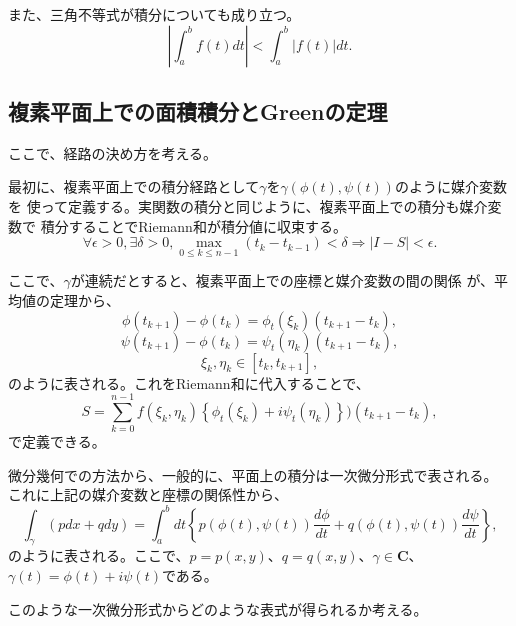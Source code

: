 また、三角不等式が積分についても成り立つ。
\begin{equation}
 \left|\int_{a}^{b}f(t)dt\right| < \int_{a}^{b}\left|f(t)\right|dt.
\end{equation}

\subsection{複素平面上での面積積分とGreenの定理}
ここで、経路の決め方を考える。

最初に、複素平面上での積分経路として$\gamma$を$\gamma (\phi (t), \psi (t))$のように媒介変数を
使って定義する。実関数の積分と同じように、複素平面上での積分も媒介変数で
積分することでRiemann和が積分値に収束する。
\begin{equation}
 \forall\epsilon >0, \exists\delta>0, 
  \max_{0\leq k\leq n-1} (t_k - t_{k-1}) < \delta
  \Rightarrow\left|I - S\right| < \epsilon.
\end{equation}

ここで、$\gamma$が連続だとすると、複素平面上での座標と媒介変数の間の関係
が、平均値の定理から、
\begin{equation}
 \phi (t_{k+1}) - \phi (t_k) = \phi_t (\xi_k) (t_{k+1} - t_k),
\end{equation}
\begin{equation}
 \psi (t_{k+1}) - \phi (t_k) = \psi_t (\eta_k) (t_{k+1} - t_k),
\end{equation}
\begin{equation}
 \xi_k, \eta_k \in [t_k, t_{k+1}],
\end{equation}
のように表される。これをRiemann和に代入することで、
\begin{equation}
 S = \sum_{k=0}^{n-1} f (\xi_k, \eta_k) 
  \left\{\phi_t (\xi_k) + i\psi_t (\eta_k)\right\})(t_{k+1} - t_k),
\end{equation}
で定義できる。

微分幾何での方法から、一般的に、平面上の積分は一次微分形式で表される。
これに上記の媒介変数と座標の関係性から、
\begin{equation}
 \int_{\gamma}(pdx + qdy) 
  = \int_{a}^{b}dt
  \left\{p\left(\phi(t), \psi(t)\right)\frac{d\phi}{dt} 
   + q\left(\phi(t), \psi(t)\right)\frac{d\psi}{dt}\right\},
\end{equation}
のように表される。ここで、$p=p(x, y)$、$q=q(x,y)$、$\gamma\in\mathbf{C}$、
$\gamma(t) = \phi (t) + i \psi (t)$である。

このような一次微分形式からどのような表式が得られるか考える。

